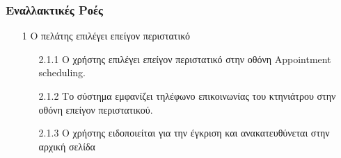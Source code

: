 \documentclass[12pt,a4paper,twoside]{book}
\begin{document}
\subsubsection{Εναλλακτικές Ροές}
\begin{enumerate}
  \item[1 ] Ο πελάτης επιλέγει επείγον περιστατικό
        \begin{enumerate}
          \item[2.1.1 ] Ο χρήστης επιλέγει επείγον περιστατικό στην οθόνη Appointment scheduling. %
          \item[2.1.2 ] Το σύστημα εμφανίζει τηλέφωνο επικοινωνίας του κτηνιάτρου  στην οθόνη επείγον περιστατικού. %
          \item[2.1.3 ] Ο χρήστης ειδοποιείται για την έγκριση και ανακατευθύνεται στην αρχική σελίδα %
        \end{enumerate}

\end{enumerate}
\end{document}
